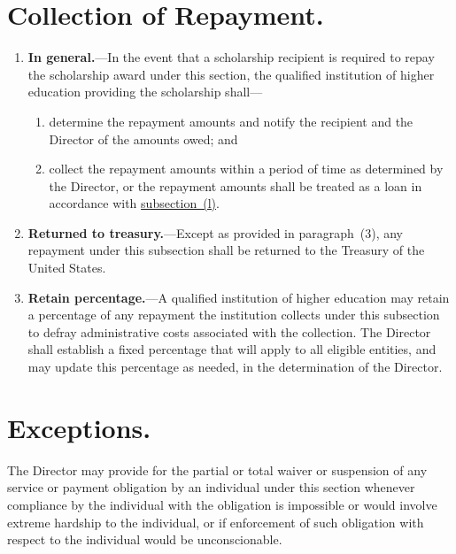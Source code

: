 \documentclass{article}
\begin{document}
    \section{Collection of Repayment.}
\begin{enumerate}
            \item {\bf In general.}---In the event that a scholarship recipient 
        is required to repay the scholarship award under this section, 
        the qualified institution of higher education providing the 
        scholarship shall---
\begin{enumerate}
                    \item determine the repayment amounts and notify the 
                recipient and the Director of the amounts owed; and
                    \item collect the repayment amounts within a period 
                of time as determined by the Director, or the repayment 
                amounts shall be treated as a loan in accordance with 
                \hyperref[sec:repay]{subsection~(l)}.
\end{enumerate}
            \item {\bf Returned to treasury.}---Except as provided in paragraph~(3), any repayment under this subsection shall be returned to 
        the Treasury of the United States.
            \item {\bf Retain percentage.}---A qualified institution of higher 
        education may retain a percentage of any repayment the 
        institution collects under this subsection to defray 
        administrative costs associated with the collection. The 
        Director shall establish a fixed percentage that will apply to 
        all eligible entities, and may update this percentage as 
        needed, in the determination of the Director.
\end{enumerate}
    \section{Exceptions.}The Director may provide for the partial or total 
waiver or suspension of any service or payment obligation by an 
individual under this section whenever compliance by the individual 
with the obligation is impossible or would involve extreme hardship to 
the individual, or if enforcement of such obligation with respect to 
the individual would be unconscionable.
\end{document}
